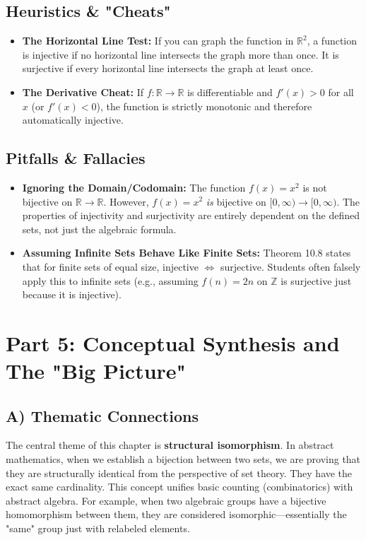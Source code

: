 \documentclass[11pt, a4paper]{article}
\theoremstyle{definition}
\theoremstyle{remark}
\newcommand{\R}{\mathbb{R}}
\newcommand{\Z}{\mathbb{Z}}
\begin{document}
\subsection{Heuristics \& "Cheats"}
\begin{itemize}
    \item \textbf{The Horizontal Line Test:} If you can graph the function in $\R^2$, a function is injective if no horizontal line intersects the graph more than once. It is surjective if every horizontal line intersects the graph at least once.
    \item \textbf{The Derivative Cheat:} If $f: \R \to \R$ is differentiable and $f'(x) > 0$ for all $x$ (or $f'(x) < 0$), the function is strictly monotonic and therefore automatically injective.
\end{itemize}

\subsection{Pitfalls \& Fallacies}
\begin{itemize}
    \item \textbf{Ignoring the Domain/Codomain:} The function $f(x) = x^2$ is not bijective on $\R \to \R$. However, $f(x) = x^2$ \textit{is} bijective on $[0, \infty) \to [0, \infty)$. The properties of injectivity and surjectivity are entirely dependent on the defined sets, not just the algebraic formula.
    \item \textbf{Assuming Infinite Sets Behave Like Finite Sets:} Theorem 10.8 states that for finite sets of equal size, injective $\iff$ surjective. Students often falsely apply this to infinite sets (e.g., assuming $f(n) = 2n$ on $\Z$ is surjective just because it is injective).
\end{itemize}

\newpage
\section{Part 5: Conceptual Synthesis and The "Big Picture"}

\subsection{A) Thematic Connections}
The central theme of this chapter is \textbf{structural isomorphism}. In abstract mathematics, when we establish a bijection between two sets, we are proving that they are structurally identical from the perspective of set theory. They have the exact same cardinality. This concept unifies basic counting (combinatorics) with abstract algebra. For example, when two algebraic groups have a bijective homomorphism between them, they are considered isomorphic—essentially the "same" group just with relabeled elements.
\end{document}
